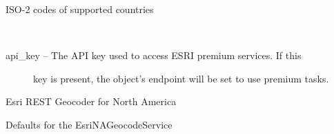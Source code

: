 \documentclass[letterpaper,10pt,english]{sphinxmanual}
\begin{document}
\begin{fulllineitems}

\begin{fulllineitems}
\label{index:omgeo.services.EsriEUGeocodeService.SUPPORTED_COUNTRIES_ISO2}
ISO-2 codes of supported countries

\end{fulllineitems}


\end{fulllineitems}


\begin{fulllineitems}
\label{index:omgeo.services.EsriGeocodeService}~\begin{description}
\item[{api\_key --  The API key used to access ESRI premium services.  If this}] \leavevmode
key is present, the object's endpoint will be set to use
premium tasks.

\end{description}

\end{fulllineitems}


\begin{fulllineitems}
\label{index:omgeo.services.EsriNA}
Esri REST Geocoder for North America

\end{fulllineitems}


\begin{fulllineitems}
\label{index:omgeo.services.EsriNAGeocodeService}
Defaults for the EsriNAGeocodeService

\end{fulllineitems}
\end{document}
